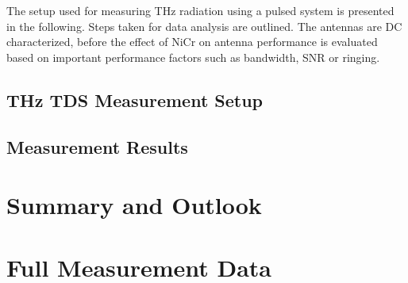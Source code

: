 \documentclass[
	german,%
	accentcolor=9c,%
	ruledheaders=section,%
	class=report,%
	thesis={type=bachelor},%
	fontsize=11pt,%
	parskip=half-,%
	custommargins=false,%
	marginpar=false,%
	BCOR = 0mm,%
 	logofile=tools/logo-installation/TUDa-logos/tuda_logo.png,%
]{tudapub}
\begin{document}
The setup used for measuring THz radiation using a pulsed system is presented in the following. Steps taken for data analysis are outlined. The antennas are DC characterized, before the effect of NiCr on antenna performance is evaluated based on important performance factors such as bandwidth, SNR or ringing. 

\section{THz TDS Measurement Setup}
\label{setup}


\section{Measurement Results}



\chapter{Summary and Outlook}

\appendix
\chapter{Full Measurement Data}


\printbibliography
\end{document}
